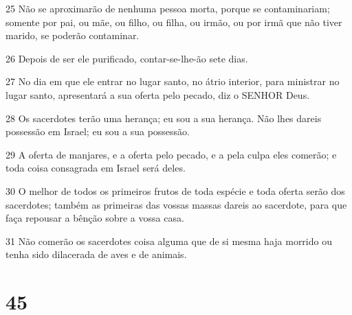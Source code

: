 \par 25 Não se aproximarão de nenhuma pessoa morta, porque se contaminariam; somente por pai, ou mãe, ou filho, ou filha, ou irmão, ou por irmã que não tiver marido, se poderão contaminar.
\par 26 Depois de ser ele purificado, contar-se-lhe-ão sete dias.
\par 27 No dia em que ele entrar no lugar santo, no átrio interior, para ministrar no lugar santo, apresentará a sua oferta pelo pecado, diz o SENHOR Deus.
\par 28 Os sacerdotes terão uma herança; eu sou a sua herança. Não lhes dareis possessão em Israel; eu sou a sua possessão.
\par 29 A oferta de manjares, e a oferta pelo pecado, e a pela culpa eles comerão; e toda coisa consagrada em Israel será deles.
\par 30 O melhor de todos os primeiros frutos de toda espécie e toda oferta serão dos sacerdotes; também as primeiras das vossas massas dareis ao sacerdote, para que faça repousar a bênção sobre a vossa casa.
\par 31 Não comerão os sacerdotes coisa alguma que de si mesma haja morrido ou tenha sido dilacerada de aves e de animais.

\chapter{45}

